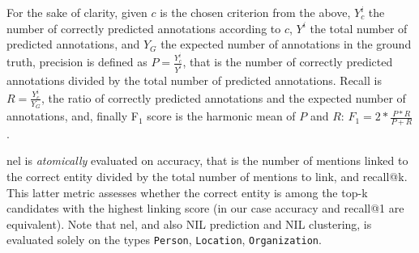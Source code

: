 
For the sake of clarity, given $c$ is the chosen criterion from the above, $Y^i_c$ the number of correctly predicted annotations according to $c$, $Y^i$ the total number of predicted annotations, and $Y_G$ the expected number of annotations in the ground truth, precision is defined as $P = \frac{Y^i_c}{Y^i}$, that is the number of correctly predicted annotations divided by the total number of predicted annotations. Recall is $R = \frac{Y^i_c}{Y_G}$, the ratio of correctly predicted annotations and the expected number of annotations, and, finally F$_1$ score is the harmonic mean of $P$ and $R$: $F_1 = 2 * \frac{P * R}{P + R}$.




\ac{nel} is \textit{atomically} evaluated on accuracy, that is the number of mentions linked to the correct entity divided by the total number of mentions to link, and recall@k. This latter metric assesses whether the correct entity is among the top-k candidates with the highest linking score (in our case accuracy and recall@1 are equivalent). Note that \ac{nel}, and also NIL prediction and NIL clustering, is evaluated solely on the types \texttt{Person}, \texttt{Location}, \texttt{Organization}. 


